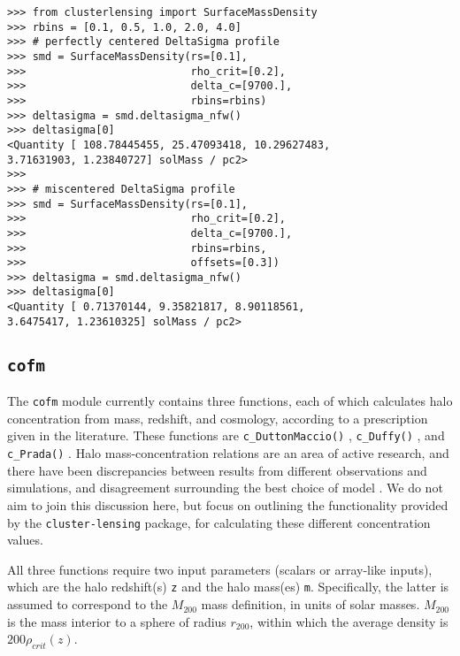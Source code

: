 \documentclass[twocolumn]{aastex6}
\newcommand{\code}{\lstinline[style=codeintext]}
\newcommand{\hcode}{\large\normalfont\texttt} %
\begin{document}
\begin{verbatim}
>>> from clusterlensing import SurfaceMassDensity
>>> rbins = [0.1, 0.5, 1.0, 2.0, 4.0]
>>> # perfectly centered DeltaSigma profile
>>> smd = SurfaceMassDensity(rs=[0.1],
>>>                          rho_crit=[0.2],
>>>                          delta_c=[9700.],
>>>                          rbins=rbins)
>>> deltasigma = smd.deltasigma_nfw()
>>> deltasigma[0]
<Quantity [ 108.78445455, 25.47093418, 10.29627483,
3.71631903, 1.23840727] solMass / pc2>
>>> 
>>> # miscentered DeltaSigma profile
>>> smd = SurfaceMassDensity(rs=[0.1],
>>>                          rho_crit=[0.2],
>>>                          delta_c=[9700.],
>>>                          rbins=rbins,
>>>                          offsets=[0.3])
>>> deltasigma = smd.deltasigma_nfw()
>>> deltasigma[0]
<Quantity [ 0.71370144, 9.35821817, 8.90118561,
3.6475417, 1.23610325] solMass / pc2>
\end{verbatim}


\subsection{\hcode{cofm}}
\label{cofm}

The \code{cofm} module currently contains three functions, each of which calculates halo concentration from mass, redshift, and cosmology, according to a prescription given in the literature. These functions are \code{c_DuttonMaccio()} \citep[for calculations following][]{Dutton14}, \code{c_Duffy()} \citep[following][]{Duffy08}, and \code{c_Prada()} \citep[for][]{Prada12}. Halo mass-concentration relations are an area of active research, and there have been discrepancies between results from different observations and simulations, and disagreement surrounding the best choice of model \citep[see e.g.][]{Dutton14, Klypin16}. We do not aim to join this discussion here, but focus on outlining the functionality provided by the \code{cluster-lensing} package, for calculating these different concentration values.

All three functions require two input parameters (scalars or array-like inputs), which are the halo redshift(s) \code{z} and the halo mass(es) \code{m}. Specifically, the latter is assumed to correspond to the $M_{200}$ mass definition, in units of solar masses. $M_{200}$ is the mass interior to a sphere of radius $r_{200}$, within which the average density is $200\rho_{crit}(z)$.
\end{document}
